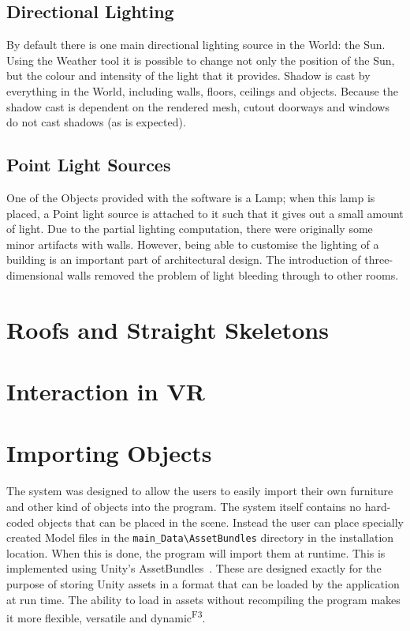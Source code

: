 \subsection{Directional Lighting}
\label{dir}

By default there is one main directional lighting source in the World: the Sun. Using the Weather tool it is possible to change not only the position of the Sun, but the colour and intensity of the light that it provides. Shadow is cast by everything in the World, including walls, floors, ceilings and objects. Because the shadow cast is dependent on the rendered mesh, cutout doorways and windows do not cast shadows (as is expected). 

\subsection{Point Light Sources}
\label{sec:points}

One of the Objects provided with the software is a Lamp; when this lamp is placed, a Point light source is attached to it such that it gives out a small amount of light. Due to the partial lighting computation, there were originally some minor artifacts with walls. However, being able to customise the lighting of a building is an important part of architectural design. The introduction of three-dimensional walls removed the problem of light bleeding through to other rooms.


\section{Roofs and Straight Skeletons}
\label{sec:roof}



\section{Interaction in VR}
\label{sec:interaction}

\section{Importing Objects}
\label{sec:objects}
\label{sec:import}
The system was designed to allow the users to easily import their own furniture and other kind of objects into the program. The system itself contains no hard-coded objects that can be placed in the scene. Instead the user can place specially created Model files in the \verb|main_Data\AssetBundles| directory in the installation location. When this is done, the program will import them  at runtime. This is implemented using Unity's AssetBundles~\cite{unity:assetbundle}. These are designed exactly for the purpose of storing Unity assets in a format that can be loaded by the application at run time. The ability to load in assets without recompiling the program makes it more flexible, versatile and dynamic\textsuperscript{F3}.

